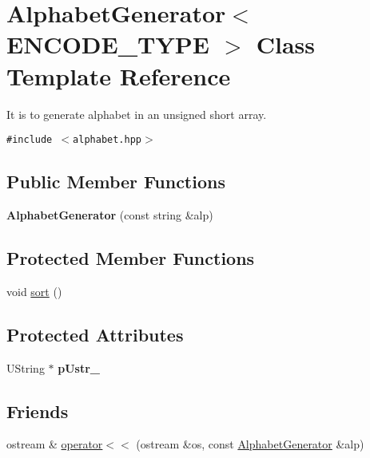 \hypertarget{classAlphabetGenerator}{
\section{AlphabetGenerator$<$ ENCODE\_\-TYPE $>$ Class Template Reference}
\label{classAlphabetGenerator}
}
It is to generate alphabet in an unsigned short array.  


{\tt \#include $<$alphabet.hpp$>$}

\subsection*{Public Member Functions}
\begin{CompactItemize}
\item 
\hypertarget{classAlphabetGenerator_5a3ad903e6f32bc0d6a4c4d6e2141409}{
\textbf{AlphabetGenerator} (const string \&alp)}
\label{classAlphabetGenerator_5a3ad903e6f32bc0d6a4c4d6e2141409}

\end{CompactItemize}
\subsection*{Protected Member Functions}
\begin{CompactItemize}
\item 
void \hyperlink{classAlphabetGenerator_043cc2c724f3a9bbb6bc2e2fa08eb9e0}{sort} ()
\end{CompactItemize}
\subsection*{Protected Attributes}
\begin{CompactItemize}
\item 
\hypertarget{classAlphabetGenerator_0db8d367924101a625df65847f309c91}{
UString $\ast$ \textbf{pUstr\_\-}}
\label{classAlphabetGenerator_0db8d367924101a625df65847f309c91}

\end{CompactItemize}
\subsection*{Friends}
\begin{CompactItemize}
\item 
ostream \& \hyperlink{classAlphabetGenerator_31333380ab17eefe3011a767aafbcbbb}{operator$<$$<$} (ostream \&os, const \hyperlink{classAlphabetGenerator}{AlphabetGenerator} \&alp)
\end{CompactItemize}


